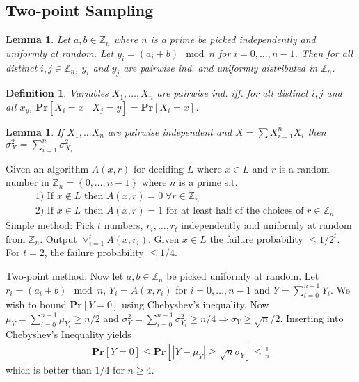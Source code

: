 \documentclass[12pt]{article}
\newtheorem{lem}[thm]{Lemma}
\newtheorem{dfn}[thm]{Definition}
\begin{document}
\subsection*{Two-point Sampling}
\begin{lem}
Let $a,b \in \mathbb{Z}_n$ where $n$ is a prime be picked independently and uniformly at random. Let $y_i = (a_i + b) \mod n$ for $i = 0, \hdots, n-1$. Then for all distinct $i,j \in \mathbb{Z}_n$, $y_i$ and $y_j$ are pairwise ind. and uniformly distributed in $\mathbb{Z}_n$. \\
\end{lem}

\begin{dfn}
Variables $X_1, \hdots, X_n$ are pairwise ind. iff. for all distinct $i,j$ and all $x_y$, $\mathbf{Pr}\left[ X_i = x \; | \; X_j = y \right] = \mathbf{Pr}\left[ X_i = x \right]$. \\
\end{dfn}

\begin{lem}
If $X_1, ... X_n$ are pairwise independent and $X = \sum X_{i=1}^n X_i$ then $\sigma^2_X = \sum_{i=1}^n \sigma_{X_i}^2$
\end{lem}

Given an algorithm $A(x,r)$ for deciding $L$ where $x \in L$ and $r$ is a random number in $\mathbb{Z}_n = \left\{ 0, \hdots, n-1 \right\}$ where $n$ is a prime s.t.
\begin{align*}
&\text{1) If } x \not\in L \text{ then } A(x,r) = 0 \; \forall r \in \mathbb{Z}_n \\
&\text{2) If } x \in L \text{ then } A(x,r) = 1 \text{ for at least half of the choices of } r \in \mathbb{Z}_n
\end{align*}
Simple method: Pick $t$ numbers, $r_i, \hdots, r_t$ independently and uniformly at random from $\mathbb{Z}_n$. Output $\lor_{i=1}^t A(x,r_i)$. Given $x \in L$ the failure probability $\leq 1/2^t$. For $t=2$, the failure probability $\leq 1/4$.

Two-point method: Now let $a,b \in \mathbb{Z}_n$ be picked uniformly at random. Let $r_i = (a_i + b) \mod n$, $Y_i = A(x, r_i)$ for $i = 0, \hdots, n-1$ and $Y=\sum_{i=0}^{n-1}Y_i$. We wish to bound $\mathbf{Pr}\left[ Y=0 \right]$ using Chebyshev's inequality. Now $\mu_{Y} = \sum^{n-1}_{i=0}\mu_{Y_i} \geq n/2$ and $\sigma_Y^2 = \sum_{i=0}^{n-1} \sigma^2_{Y_{i}} \geq n/4 \Rightarrow \sigma_Y \geq \sqrt{n}/2$. Inserting into Chebyshev's Inequality yields
\begin{align*}
\mathbf{Pr}\left[ Y = 0 \right] \leq \mathbf{Pr}\left[ \left| Y - \mu_Y \right| \geq \sqrt{n} \sigma_Y \right] \leq \frac{1}{n}
\end{align*}
which is better than $1/4$ for $n \geq 4$.
\end{document}
